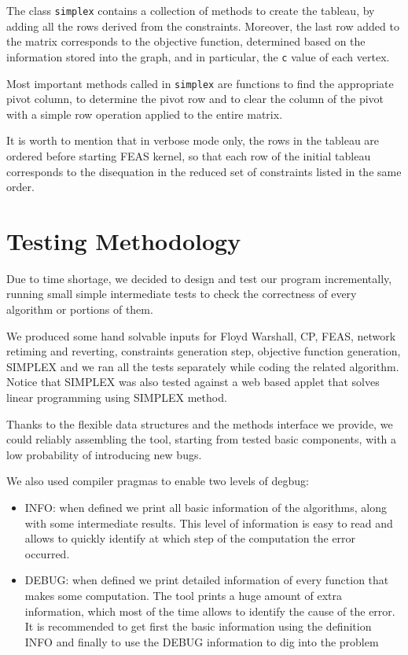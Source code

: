 \documentclass{acm_proc_article-sp}
\begin{document}
The class \texttt{simplex} contains a collection of methods to create the tableau,
by adding all the rows derived from the constraints. Moreover, the last row added
to the matrix corresponds to the objective function, determined based on the
information stored into the graph, and in particular, the \texttt{c} value of
each vertex.

Most important methods called in \texttt{simplex} are functions to find the
appropriate pivot column, to determine the pivot row and to clear the column
of the pivot with a simple row operation applied to the entire matrix.

It is worth to mention that in verbose mode only, the rows in the tableau are
ordered before starting FEAS kernel, so that each row of the initial tableau
corresponds to the disequation in the reduced set of constraints listed in the
same order.


\section{Testing Methodology}

Due to time shortage, we decided to design and test our program
incrementally, running small simple intermediate tests to check the correctness
of every algorithm or portions of them.

We produced some hand solvable inputs for Floyd Warshall, CP, FEAS, network
retiming and reverting, constraints generation step, objective function generation,
SIMPLEX and we ran all the tests separately while coding the related algorithm.
Notice that SIMPLEX was also tested against a web based applet that solves
linear programming using SIMPLEX method.

Thanks to the flexible data structures and the methods interface we provide, we
could reliably assembling the tool, starting from tested basic components,
with a low probability of introducing new bugs.

We also used compiler pragmas to enable two levels of degbug:
\begin{itemize}
 \item {INFO}: when defined we print all basic information of the algorithms,
   along with some intermediate results. This level of information is easy to read
   and allows to quickly identify at which step of the computation the error
   occurred.
 \item {DEBUG}: when defined we print detailed information of every function
   that makes some computation. The tool prints a huge amount of extra information,
   which most of the time allows to identify the cause of the error. It is
   recommended to get first the basic information using the definition INFO
   and finally to use the DEBUG information to dig into the problem
\end{itemize}
\end{document}
